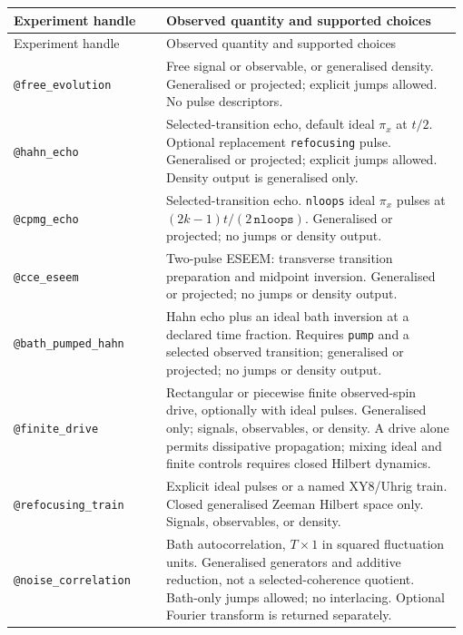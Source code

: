 \documentclass[11pt,a4paper]{article}
\newcommand{\code}[1]{\texttt{#1}}
\begin{document}
\begingroup\small
\begin{longtable}{@{}>{\raggedright\arraybackslash}p{0.335\linewidth}@{\hspace{0.025\linewidth}}>{\raggedright\arraybackslash}p{0.64\linewidth}@{}}
\toprule
Experiment handle & Observed quantity and supported choices\\
\midrule\endfirsthead
\toprule
Experiment handle & Observed quantity and supported choices\\
\midrule\endhead
\midrule\endfoot
\bottomrule\endlastfoot
\code{@free\_evolution} & Free signal or observable, or generalised density. Generalised or projected; explicit jumps allowed. No pulse descriptors.\\
\code{@hahn\_echo} & Selected-transition echo, default ideal $\pi_x$ at $t/2$. Optional replacement \code{refocusing} pulse. Generalised or projected; explicit jumps allowed. Density output is generalised only.\\
\code{@cpmg\_echo} & Selected-transition echo. \code{nloops} ideal $\pi_x$ pulses at $(2k-1)t/(2\,\code{nloops})$. Generalised or projected; no jumps or density output.\\
\code{@cce\_eseem} & Two-pulse ESEEM: transverse transition preparation and midpoint inversion. Generalised or projected; no jumps or density output.\\
\code{@bath\_pumped\_hahn} & Hahn echo plus an ideal bath inversion at a declared time fraction. Requires \code{pump} and a selected observed transition; generalised or projected; no jumps or density output.\\
\code{@finite\_drive} & Rectangular or piecewise finite observed-spin drive, optionally with ideal pulses. Generalised only; signals, observables, or density. A drive alone permits dissipative propagation; mixing ideal and finite controls requires closed Hilbert dynamics.\\
\code{@refocusing\_train} & Explicit ideal pulses or a named XY8/Uhrig train. Closed generalised Zeeman Hilbert space only. Signals, observables, or density.\\
\code{@noise\_correlation} & Bath autocorrelation, $T\times1$ in squared fluctuation units. Generalised generators and additive reduction, not a selected-coherence quotient. Bath-only jumps allowed; no interlacing. Optional Fourier transform is returned separately.\\
\end{longtable}
\endgroup
\end{document}
